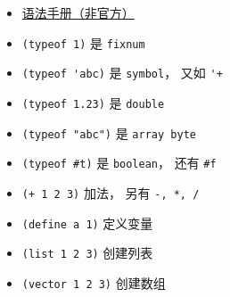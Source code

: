 
\begin{itemize}
\item \href{https://code.google.com/archive/p/femtolisp/wikis/Manual.wiki}{语法手册（非官方）}
\item \verb`(typeof 1)` 是 \verb`fixnum`
\item \verb`(typeof 'abc)` 是 \verb`symbol`， 又如 \verb`'+`
\item \verb`(typeof 1.23)` 是 \verb`double`
\item \verb`(typeof "abc")` 是 \verb`array byte`
\item \verb`(typeof #t)` 是 \verb`boolean`， 还有 \verb`#f`
\item \verb`(+ 1 2 3)` 加法， 另有 \verb`-, *, /`
\item \verb`(define a 1)` 定义变量
\item \verb`(list 1 2 3)` 创建列表
\item \verb`(vector 1 2 3)` 创建数组


\end{itemize}

